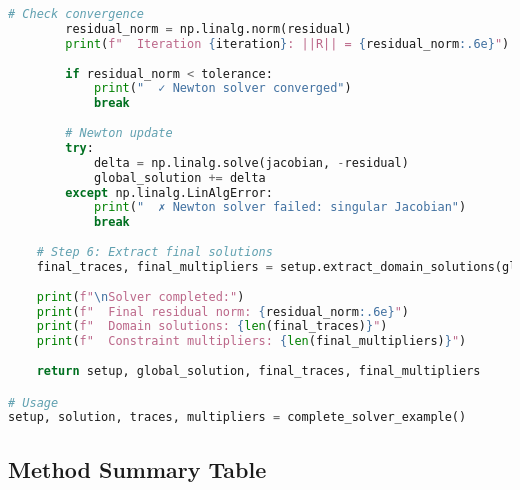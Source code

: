\begin{lstlisting}[language=Python, caption=Complete Solver Setup Example]
        # Check convergence
        residual_norm = np.linalg.norm(residual)
        print(f"  Iteration {iteration}: ||R|| = {residual_norm:.6e}")
        
        if residual_norm < tolerance:
            print("  ✓ Newton solver converged")
            break
        
        # Newton update
        try:
            delta = np.linalg.solve(jacobian, -residual)
            global_solution += delta
        except np.linalg.LinAlgError:
            print("  ✗ Newton solver failed: singular Jacobian")
            break
    
    # Step 6: Extract final solutions
    final_traces, final_multipliers = setup.extract_domain_solutions(global_solution)
    
    print(f"\nSolver completed:")
    print(f"  Final residual norm: {residual_norm:.6e}")
    print(f"  Domain solutions: {len(final_traces)}")
    print(f"  Constraint multipliers: {len(final_multipliers)}")
    
    return setup, global_solution, final_traces, final_multipliers

# Usage
setup, solution, traces, multipliers = complete_solver_example()
\end{lstlisting}

\subsection{Method Summary Table}
\label{subsec:method_summary_detailed}

